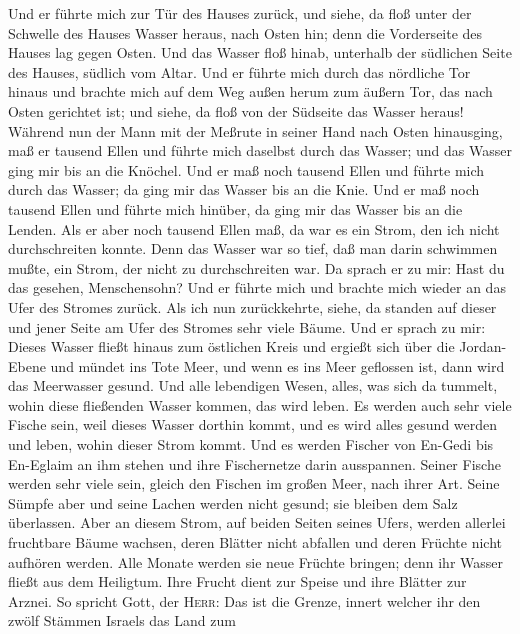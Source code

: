  Und er führte mich zur Tür des Hauses zurück, und siehe,
da floß unter der Schwelle des Hauses Wasser heraus, nach Osten hin;
denn die Vorderseite des Hauses lag gegen Osten. Und das Wasser floß
hinab, unterhalb der südlichen Seite des Hauses, südlich vom Altar.
 Und er führte mich durch das nördliche Tor hinaus und
brachte mich auf dem Weg außen herum zum äußern Tor, das nach Osten
gerichtet ist; und siehe, da floß von der Südseite das Wasser heraus!
 Während nun der Mann mit der Meßrute in seiner Hand nach
Osten hinausging, maß er tausend Ellen und führte mich daselbst durch
das Wasser; und das Wasser ging mir bis an die Knöchel. 
Und er maß noch tausend Ellen und führte mich durch das Wasser; da ging
mir das Wasser bis an die Knie. Und er maß noch tausend Ellen und führte
mich hinüber, da ging mir das Wasser bis an die Lenden. 
Als er aber noch tausend Ellen maß, da war es ein Strom, den ich nicht
durchschreiten konnte. Denn das Wasser war so tief, daß man darin
schwimmen mußte, ein Strom, der nicht zu durchschreiten war.
 Da sprach er zu mir: Hast du das gesehen, Menschensohn?
Und er führte mich und brachte mich wieder an das Ufer des Stromes
zurück.  Als ich nun zurückkehrte, siehe, da standen auf
dieser und jener Seite am Ufer des Stromes sehr viele Bäume.
 Und er sprach zu mir: Dieses Wasser fließt hinaus zum
östlichen Kreis und ergießt sich über die Jordan-Ebene und mündet ins
Tote Meer, und wenn es ins Meer geflossen ist, dann wird das Meerwasser
gesund.  Und alle lebendigen Wesen, alles, was sich da
tummelt, wohin diese fließenden Wasser kommen, das wird leben. Es werden
auch sehr viele Fische sein, weil dieses Wasser dorthin kommt, und es
wird alles gesund werden und leben, wohin dieser Strom kommt.
 Und es werden Fischer von En-Gedi bis En-Eglaim an ihm
stehen und ihre Fischernetze darin ausspannen. Seiner Fische werden sehr
viele sein, gleich den Fischen im großen Meer, nach ihrer Art.
 Seine Sümpfe aber und seine Lachen werden nicht gesund;
sie bleiben dem Salz überlassen.  Aber an diesem Strom,
auf beiden Seiten seines Ufers, werden allerlei fruchtbare Bäume
wachsen, deren Blätter nicht abfallen und deren Früchte nicht aufhören
werden. Alle Monate werden sie neue Früchte bringen; denn ihr Wasser
fließt aus dem Heiligtum. Ihre Frucht dient zur Speise und ihre Blätter
zur Arznei.  So spricht Gott, der \textsc{Herr}: Das ist
die Grenze, innert welcher ihr den zwölf Stämmen Israels das Land zum
